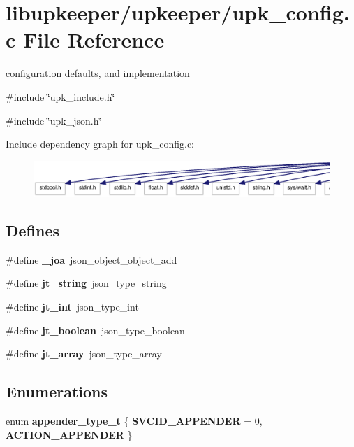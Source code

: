\section{libupkeeper/upkeeper/upk\_\-config.c File Reference}
\label{upk__config_8c}


configuration defaults, and implementation  


{\ttfamily \#include \char`\"{}upk\_\-include.h\char`\"{}}\par
{\ttfamily \#include \char`\"{}upk\_\-json.h\char`\"{}}\par
Include dependency graph for upk\_\-config.c:\nopagebreak
\begin{figure}[H]
\begin{center}
\leavevmode
\includegraphics[width=400pt]{upk__config_8c__incl}
\end{center}
\end{figure}
\subsection*{Defines}
\begin{DoxyCompactItemize}
\item 
\#define {\bf \_\-joa}~json\_\-object\_\-object\_\-add
\item 
\#define {\bf jt\_\-string}~json\_\-type\_\-string
\item 
\#define {\bf jt\_\-int}~json\_\-type\_\-int
\item 
\#define {\bf jt\_\-boolean}~json\_\-type\_\-boolean
\item 
\#define {\bf jt\_\-array}~json\_\-type\_\-array
\end{DoxyCompactItemize}
\subsection*{Enumerations}
\begin{DoxyCompactItemize}
\item 
enum {\bf appender\_\-type\_\-t} \{ {\bf SVCID\_\-APPENDER} =  0, 
{\bf ACTION\_\-APPENDER}
 \}
\end{DoxyCompactItemize}
